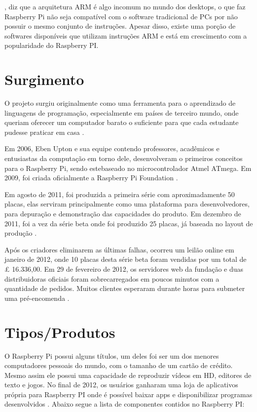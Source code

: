 \documentclass[
	12pt,				%
	openright,			%
	twoside,			%
	a4paper,			%
	chapter=TITLE,		%
	english,			%
	brazil				%
	]{abntex2}
\begin{document}
, diz que a arquitetura ARM é algo incomum no mundo dos desktops, o que faz Raspberry Pi não seja compatível com o software tradicional de PCs por não possuir o mesmo conjunto de instruções. Apesar disso, existe uma porção de softwares disponíveis que utilizam instruções ARM e está em crescimento com a popularidade do Raspberry PI.


\section{Surgimento}

O projeto surgiu originalmente como uma ferramenta para o aprendizado de linguagens de programação, especialmente em países de terceiro mundo, onde queriam oferecer um computador barato o suficiente para que cada estudante pudesse praticar em casa \cite{ClubeHardware}.

Em 2006, Eben Upton e sua equipe contendo professores, acadêmicos e entusiastas da computação em torno dele, desenvolveram o primeiros conceitos para o Raspberry Pi, sendo estebaseado no microcontrolador Atmel ATmega. Em 2009, foi criada oficialmente a Raspberry Pi Foundation \cite{eben2013raspberry}. 

Em agosto de 2011, foi produzida a primeira série com aproximadamente 50 placas, elas serviram principalmente como uma plataforma para desenvolvedores, para depuração e demonstração das capacidades do produto. Em dezembro de 2011, foi a vez da série beta onde foi produzido 25 placas, já baseada no layout de produção \cite{Werner.Raspberry}.

Após os criadores eliminarem as últimas falhas, ocorreu um leilão online em janeiro de 2012, onde 10 placas desta série beta foram vendidas por um total de £ 16.336,00. Em 29 de fevereiro de 2012, os servidores web da fundação e duas distribuidoras oficiais foram sobrecarregados em poucos minutos com a quantidade de pedidos. Muitos clientes esperaram durante horas para submeter uma pré-encomenda \cite{Werner.Raspberry}.


\section{Tipos/Produtos}


O Raspberry Pi possui alguns títulos, um deles foi ser um dos menores computadores pessoais do mundo, com o tamanho de um cartão de crédito. Mesmo assim ele possui uma capacidade de reproduzir vídeos em HD, editores de texto e jogos. No final de 2012, os usuários ganharam uma loja de aplicativos própria para Raspberry PI onde é possível baixar apps e disponibilizar programas desenvolvidos \cite{revistagalileu}. Abaixo segue a lista de componentes contidos no Raspberry PI:
\end{document}
